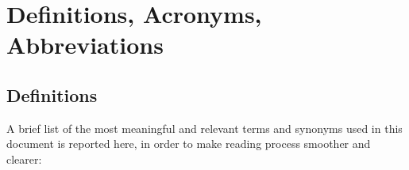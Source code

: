 \newpage
\section{Definitions, Acronyms, Abbreviations}

\subsection{Definitions}

A brief list of the most meaningful and relevant terms and synonyms used in this document is reported
here, in order to make reading process smoother and clearer:

